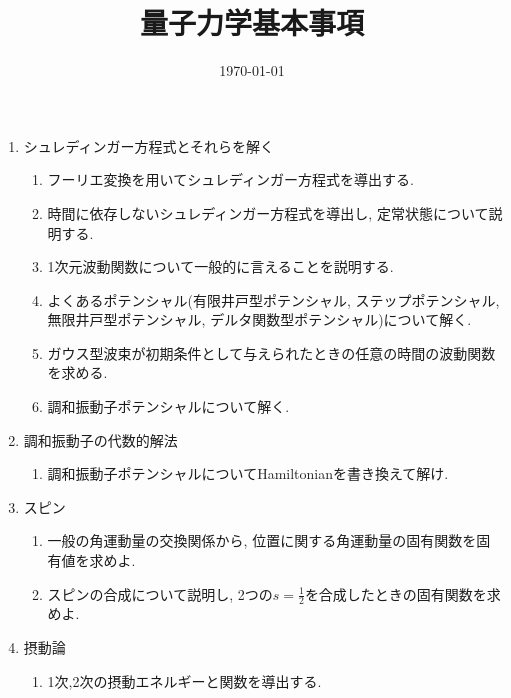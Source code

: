 \documentclass[11pt,a4paper]{jarticle}
\title{量子力学基本事項}
\author{}
\date{\today}
\begin{document}
\maketitle
\begin{enumerate}
    \item シュレディンガー方程式とそれらを解く
    \begin{enumerate}
        \item フーリエ変換を用いてシュレディンガー方程式を導出する.
        \item 時間に依存しないシュレディンガー方程式を導出し, 定常状態について説明する.
        \item 1次元波動関数について一般的に言えることを説明する.
        \item よくあるポテンシャル(有限井戸型ポテンシャル, ステップポテンシャル, 無限井戸型ポテンシャル, デルタ関数型ポテンシャル)について解く.
        \item ガウス型波束が初期条件として与えられたときの任意の時間の波動関数を求める.
        \item 調和振動子ポテンシャルについて解く.
    \end{enumerate}
    \item 調和振動子の代数的解法
    \begin{enumerate}
        \item 調和振動子ポテンシャルについてHamiltonianを書き換えて解け.
    \end{enumerate}
    \item スピン
    \begin{enumerate}
        \item 一般の角運動量の交換関係から, 位置に関する角運動量の固有関数を固有値を求めよ.
        \item スピンの合成について説明し, 2つの$s=\frac{1}{2}$を合成したときの固有関数を求めよ.
    \end{enumerate}
    \item 摂動論
    \begin{enumerate}
        \item 1次,2次の摂動エネルギーと関数を導出する.
    \end{enumerate}
\end{enumerate}
\end{document}
